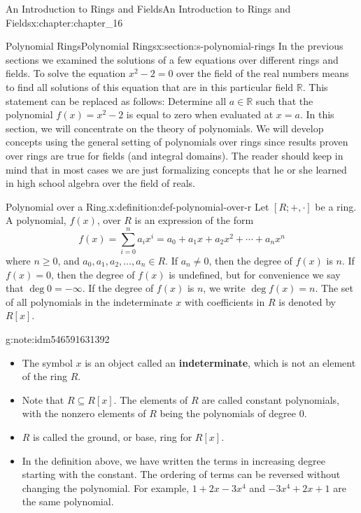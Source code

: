 \documentclass[oneside,10pt,]{book}
\newcommand{\terminology}[1]{\textbf{#1}}
\numberwithin{equation}{section}
\begin{document}
\begin{chapterptx}{An Introduction to Rings and Fields}{}{An Introduction to Rings and Fields}{}{}{x:chapter:chapter_16}
\begin{sectionptx}{Polynomial Rings}{}{Polynomial Rings}{}{}{x:section:s-polynomial-rings}
In the previous sections we examined the solutions of a few equations over different rings and fields. To solve the equation \(x^2- 2 = 0\) over the field of the real numbers means to find all solutions of this equation that are in this particular field \(\mathbb{R}\). This statement can be replaced as follows: Determine all \(a \in  \mathbb{R}\) such that the polynomial \(f(x) = x^2 - 2\) is equal to zero when evaluated at \(x=a\). In this section, we will concentrate on  the theory of polynomials. We will develop concepts using the general setting of polynomials over rings since results proven over rings are true for fields (and integral domains). The reader should keep in mind that in most cases we are just formalizing concepts that he or she learned in high school algebra over the field of reals.%
\begin{definition}{Polynomial over a Ring.}{x:definition:def-polynomial-over-r}%
%
\label{g:notation:idm546591634576}%
\label{g:notation:idm546591633600}%
Let \([R; +, \cdot ]\) be a ring.  A polynomial, \(f(x)\), over \(R\) is an expression of the form%
\begin{equation*}
f(x)=\sum _{i=0}^n a_i x^i=a_0 + a_1 x+a_2 x^2+ \cdots +a_n x^n
\end{equation*}
where \(n\geq 0\), and \(a_0, a_1, a_2, \ldots, a_n \in  R\).  If  \(a_n \neq  0\),  then the degree of \(f(x)\) is \(n\).  If \(f(x) = 0\), then the degree of \(f(x)\) is undefined, but for convenience we say that \(\deg 0 = -\infty\).  If the degree of \(f(x)\) is \(n\), we write \(\deg f(x) = n\). The set of all polynomials in the indeterminate \(x\) with coefficients in \(R\) is denoted by \(R[x]\).%
\end{definition}
\begin{note}{}{g:note:idm546591631392}%
%
\begin{itemize}[label=\textbullet]
\item{}The symbol \(x\) is an object called an \terminology{indeterminate}, which is not an element of the ring \(R\).%
\item{}Note that \(R\subseteq  R[x]\). The elements of \(R\) are called constant polynomials, with the nonzero elements of \(R\) being the polynomials of degree 0.%
\item{}\(R\) is called the ground, or base, ring for \(R[x]\).%
\item{}In the definition above, we have written the terms in increasing degree starting with the constant.  The ordering of terms can be reversed without changing the polynomial.  For example,  \(1 + 2 x -3x^4\) and  \(-3x^4+2 x+1\) are the same polynomial.%

\end{itemize}
\end{note}
\end{sectionptx}
\end{chapterptx}
\end{document}
